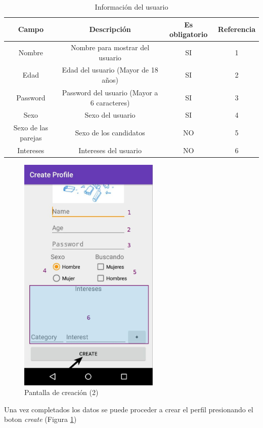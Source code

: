 \documentclass[10pt,letterpaper,extrafontsizes]{memoir}
\begin{document}
\begin{table}[H]
\centering
\begin{tabular}{|c|c|c|c|}
\hline
Campo&Descripción&Es obligatorio&Referencia\\
\hline \hline
Nombre&Nombre para mostrar del usuario&SI&1\\ \hline
Edad&Edad del usuario (Mayor de 18 años)&SI&2\\ \hline
Password&Password del usuario (Mayor a 6 caracteres)&SI&3\\ \hline
Sexo&Sexo del usuario&SI&4\\ \hline
Sexo de las parejas&Sexo de los candidatos&NO&5\\ \hline
Intereses&Intereses del usuario&NO&6\\ \hline
\end{tabular}
\caption{Información del usuario}
\label{table:campos}
\end{table}

\begin{figure}[H]
    \centering
\includegraphics[width=0.6\textwidth]{graficos/capturas/j}
    \caption{Pantalla de creación (2)}
    \label{fig:createppagl}
\end{figure}

Una vez completados los datos se puede proceder a crear el perfil presionando el boton \emph{create} (Figura \ref{fig:createppagl})
\end{document}
